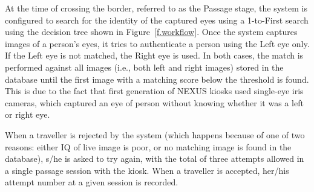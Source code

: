 \documentclass{cta-author}%
\newcommand{\cmt}[1]{}
\begin{document}



\cmt{
The workflow and the decision logic of the NEXUS kiosks of the first generation are summarized in 
Figure \ref{f.workflow}. 
}


At the time of crossing the border, referred to as the Passage stage, 
the system is configured to search for the identity of the captured eyes using a 1-to-First search using the decision tree shown in 
 Figure~\ref{f.workflow}. 
Once the system captures images of a person's eyes, it tries to authenticate a person using the Left eye only. If the Left eye is not matched, the Right eye is used. In both cases, the match is performed against all images (i.e., both left and right images) stored in the database  until the first image with a matching score below the threshold is found.
 This is due to the fact that first generation of NEXUS kiosks used single-eye iris cameras, which captured  an eye of person without knowing whether it was a left or right eye. 


When a traveller is rejected by the system (which happens because of one of two reasons: either IQ of live image is poor, or no matching image is found in the database), s/he is asked to try again, with the total of three  attempts  allowed in a single passage session with the kiosk. When a traveller is accepted, her/his attempt number at a given session is recorded.
\end{document}
